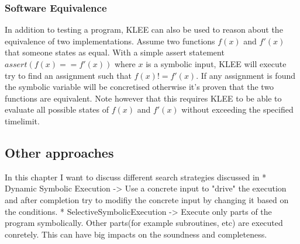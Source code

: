 \subsubsection{Software Equivalence}
In addition to testing a program, KLEE can also be used to reason about the equivalence of two implementations. Assume two functions $f(x)$ and $f'(x)$ that someone states as equal. With a simple assert statement $assert(f(x) == f'(x))$ where $x$ is a symbolic input, KLEE will execute try to find an assignment such that $f(x) != f'(x)$. If any assignment is found the symbolic variable will be concretised otherwise it's proven that the two functions are equivalent. Note however that this requires KLEE to be able to evaluate all possible states of $f(x)$ and $f'(x)$ without exceeding the specified timelimit.
\subsection{Other approaches}
In this chapter I want to discuss different search strategies discussed in \cite{SurveySymExec-CSUR18}
* Dynamic Symbolic Execution -> Use a concrete input to "drive" the execution and after completion try to modifiy the concrete input by changing it based on the conditions. \cite{Godefroid:2005:DDA:1064978.1065036}
* SelectiveSymbolicExecution -> Execute only parts of the program symbolically. Other parts(for example subroutines, etc) are executed conretely. This can have big impacts on the soundness and completeness. \cite{Chipounov:2012:SPD:2110356.2110358}
